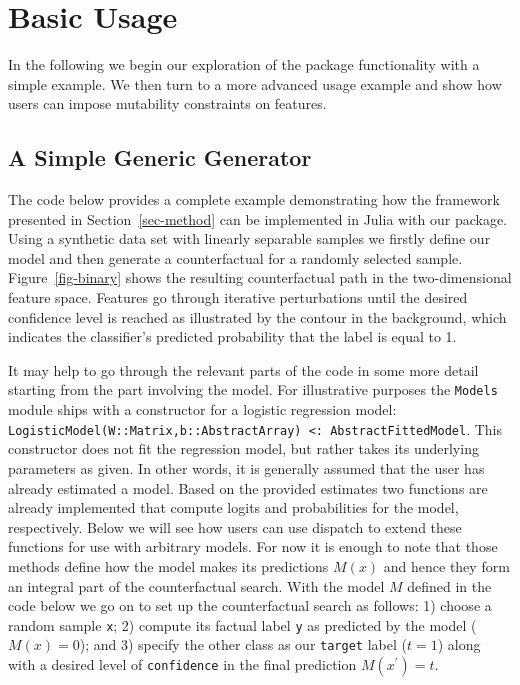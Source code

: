 \documentclass[
  letterpaper,
  DIV=11,
  numbers=noendperiod]{scrartcl}
\begin{document}
\hypertarget{sec-use}{%
\section{Basic Usage}\label{sec-use}}

In the following we begin our exploration of the package functionality
with a simple example. We then turn to a more advanced usage example and
show how users can impose mutability constraints on features.

\hypertarget{a-simple-generic-generator}{%
\subsection{A Simple Generic
Generator}\label{a-simple-generic-generator}}

The code below provides a complete example demonstrating how the
framework presented in Section~\ref{sec-method} can be implemented in
Julia with our package. Using a synthetic data set with linearly
separable samples we firstly define our model and then generate a
counterfactual for a randomly selected sample. Figure~\ref{fig-binary}
shows the resulting counterfactual path in the two-dimensional feature
space. Features go through iterative perturbations until the desired
confidence level is reached as illustrated by the contour in the
background, which indicates the classifier's predicted probability that
the label is equal to 1.

It may help to go through the relevant parts of the code in some more
detail starting from the part involving the model. For illustrative
purposes the \texttt{Models} module ships with a constructor for a
logistic regression model:
\texttt{LogisticModel(W::Matrix,b::AbstractArray)\ \textless{}:\ AbstractFittedModel}.
This constructor does not fit the regression model, but rather takes its
underlying parameters as given. In other words, it is generally assumed
that the user has already estimated a model. Based on the provided
estimates two functions are already implemented that compute logits and
probabilities for the model, respectively. Below we will see how users
can use dispatch to extend these functions for use with arbitrary
models. For now it is enough to note that those methods define how the
model makes its predictions \(M(x)\) and hence they form an integral
part of the counterfactual search. With the model \(M\) defined in the
code below we go on to set up the counterfactual search as follows: 1)
choose a random sample \texttt{x}; 2) compute its factual label
\texttt{y} as predicted by the model (\(M(x)=0\)); and 3) specify the
other class as our \texttt{target} label (\(t=1\)) along with a desired
level of \texttt{confidence} in the final prediction \(M(x^\prime)=t\).
\end{document}
